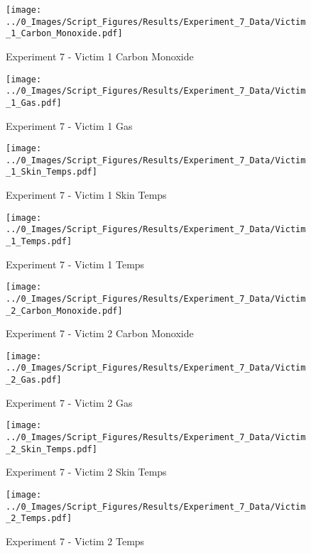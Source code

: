 	\clearpage

	\begin{figure}[H]
		\centering
		\texttt{[image: ../0\_Images/Script\_Figures/Results/Experiment\_7\_Data/Victim\_1\_Carbon\_Monoxide.pdf]}
		\caption[]{Experiment 7 - Victim 1 Carbon Monoxide}
	\end{figure}
 

	\begin{figure}[H]
		\centering
		\texttt{[image: ../0\_Images/Script\_Figures/Results/Experiment\_7\_Data/Victim\_1\_Gas.pdf]}
		\caption[]{Experiment 7 - Victim 1 Gas}
	\end{figure}
 
	\clearpage

	\begin{figure}[H]
		\centering
		\texttt{[image: ../0\_Images/Script\_Figures/Results/Experiment\_7\_Data/Victim\_1\_Skin\_Temps.pdf]}
		\caption[]{Experiment 7 - Victim 1 Skin Temps}
	\end{figure}
 

	\begin{figure}[H]
		\centering
		\texttt{[image: ../0\_Images/Script\_Figures/Results/Experiment\_7\_Data/Victim\_1\_Temps.pdf]}
		\caption[]{Experiment 7 - Victim 1 Temps}
	\end{figure}
 
	\clearpage

	\begin{figure}[H]
		\centering
		\texttt{[image: ../0\_Images/Script\_Figures/Results/Experiment\_7\_Data/Victim\_2\_Carbon\_Monoxide.pdf]}
		\caption[]{Experiment 7 - Victim 2 Carbon Monoxide}
	\end{figure}
 

	\begin{figure}[H]
		\centering
		\texttt{[image: ../0\_Images/Script\_Figures/Results/Experiment\_7\_Data/Victim\_2\_Gas.pdf]}
		\caption[]{Experiment 7 - Victim 2 Gas}
	\end{figure}
 
	\clearpage

	\begin{figure}[H]
		\centering
		\texttt{[image: ../0\_Images/Script\_Figures/Results/Experiment\_7\_Data/Victim\_2\_Skin\_Temps.pdf]}
		\caption[]{Experiment 7 - Victim 2 Skin Temps}
	\end{figure}
 

	\begin{figure}[H]
		\centering
		\texttt{[image: ../0\_Images/Script\_Figures/Results/Experiment\_7\_Data/Victim\_2\_Temps.pdf]}
		\caption[]{Experiment 7 - Victim 2 Temps}
	\end{figure}
 
